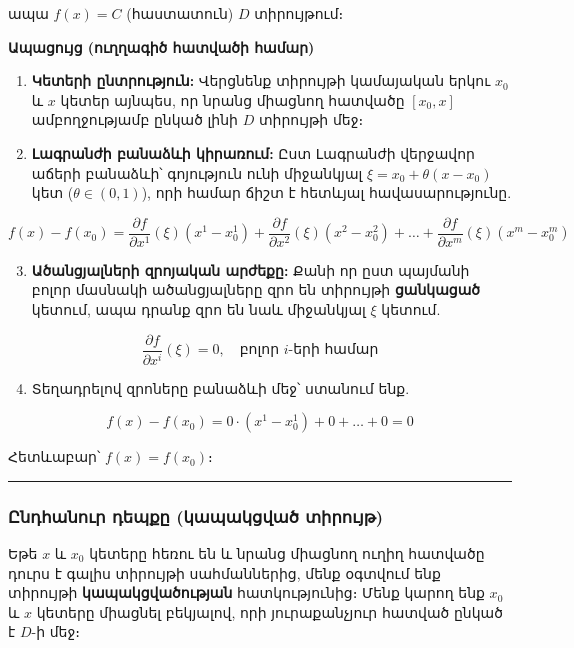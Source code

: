 \documentclass[12pt, a4paper]{article}
\begin{document}
ապա $f(x) = C$ (հաստատուն) $D$ տիրույթում։

\textbf{Ապացույց (ուղղագիծ հատվածի համար)}
\begin{enumerate}
    \item \textbf{Կետերի ընտրություն:} Վերցնենք տիրույթի կամայական երկու $x_0$ և $x$ կետեր այնպես, որ նրանց միացնող հատվածը $[x_0, x]$ ամբողջությամբ ընկած լինի $D$ տիրույթի մեջ։
    \item \textbf{Լագրանժի բանաձևի կիրառում:} Ըստ Լագրանժի վերջավոր աճերի բանաձևի՝ գոյություն ունի միջանկյալ $\xi = x_0 + \theta(x - x_0)$ կետ ($\theta \in (0, 1)$), որի համար ճիշտ է հետևյալ հավասարությունը.
\end{enumerate}

$$f(x) - f(x_0) = \frac{\partial f}{\partial x^1}(\xi)(x^1 - x_0^1) + \frac{\partial f}{\partial x^2}(\xi)(x^2 - x_0^2) + \dots + \frac{\partial f}{\partial x^m}(\xi)(x^m - x_0^m)$$

\begin{enumerate}
    \setcounter{enumi}{2}
    \item \textbf{Ածանցյալների զրոյական արժեքը:} Քանի որ ըստ պայմանի բոլոր մասնակի ածանցյալները զրո են տիրույթի \textbf{ցանկացած} կետում, ապա դրանք զրո են նաև միջանկյալ $\xi$ կետում.
\end{enumerate}

$$\frac{\partial f}{\partial x^i}(\xi) = 0, \quad \text{բոլոր } i \text{-երի համար}$$

\begin{enumerate}
    \setcounter{enumi}{3}
    \item Տեղադրելով զրոները բանաձևի մեջ՝ ստանում ենք.
\end{enumerate}

$$f(x) - f(x_0) = 0 \cdot (x^1 - x_0^1) + 0 + \dots + 0 = 0$$

Հետևաբար՝ \textbf{$f(x) = f(x_0)$}։

\vspace{1em}
\hrule
\vspace{1em}

\subsubsection{Ընդհանուր դեպքը (կապակցված տիրույթ)}

Եթե $x$ և $x_0$ կետերը հեռու են և նրանց միացնող ուղիղ հատվածը դուրս է գալիս տիրույթի սահմաններից, մենք օգտվում ենք տիրույթի \textbf{կապակցվածության} հատկությունից։ Մենք կարող ենք $x_0$ և $x$ կետերը միացնել բեկյալով, որի յուրաքանչյուր հատված ընկած է $D$-ի մեջ։
\end{document}
